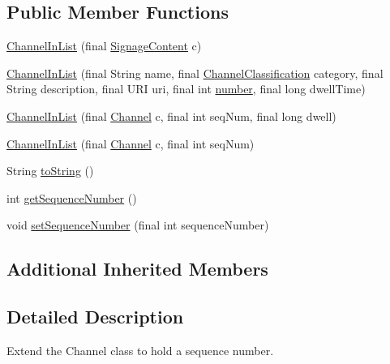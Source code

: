 \subsection*{Public Member Functions}
\begin{DoxyCompactItemize}
\item 
\hyperlink{classgov_1_1fnal_1_1ppd_1_1dd_1_1channel_1_1ChannelInList_a400379d26979426b04461bd0909d26ca}{Channel\-In\-List} (final \hyperlink{interfacegov_1_1fnal_1_1ppd_1_1dd_1_1signage_1_1SignageContent}{Signage\-Content} c)
\item 
\hyperlink{classgov_1_1fnal_1_1ppd_1_1dd_1_1channel_1_1ChannelInList_aa62eabd5ac9715d5a95ade9fbb07062c}{Channel\-In\-List} (final String name, final \hyperlink{classgov_1_1fnal_1_1ppd_1_1dd_1_1changer_1_1ChannelClassification}{Channel\-Classification} category, final String description, final U\-R\-I uri, final int \hyperlink{classgov_1_1fnal_1_1ppd_1_1dd_1_1channel_1_1ChannelImpl_ae4de39eb5e2f7c434f3b71f054ae9735}{number}, final long dwell\-Time)
\item 
\hyperlink{classgov_1_1fnal_1_1ppd_1_1dd_1_1channel_1_1ChannelInList_a3b2d4b3a713237d50a4d6c625b284de1}{Channel\-In\-List} (final \hyperlink{interfacegov_1_1fnal_1_1ppd_1_1dd_1_1signage_1_1Channel}{Channel} c, final int seq\-Num, final long dwell)
\item 
\hyperlink{classgov_1_1fnal_1_1ppd_1_1dd_1_1channel_1_1ChannelInList_a403246d41b3c9f9bef16cfa4c9ca6e96}{Channel\-In\-List} (final \hyperlink{interfacegov_1_1fnal_1_1ppd_1_1dd_1_1signage_1_1Channel}{Channel} c, final int seq\-Num)
\item 
String \hyperlink{classgov_1_1fnal_1_1ppd_1_1dd_1_1channel_1_1ChannelInList_a4fced725b7768aea98ae85549c937388}{to\-String} ()
\item 
int \hyperlink{classgov_1_1fnal_1_1ppd_1_1dd_1_1channel_1_1ChannelInList_a73b9620309ba3f2e8cd7142e9f107227}{get\-Sequence\-Number} ()
\item 
void \hyperlink{classgov_1_1fnal_1_1ppd_1_1dd_1_1channel_1_1ChannelInList_a248382f22bfd71369082af07784e0fff}{set\-Sequence\-Number} (final int sequence\-Number)
\end{DoxyCompactItemize}
\subsection*{Additional Inherited Members}


\subsection{Detailed Description}
Extend the Channel class to hold a sequence number.

